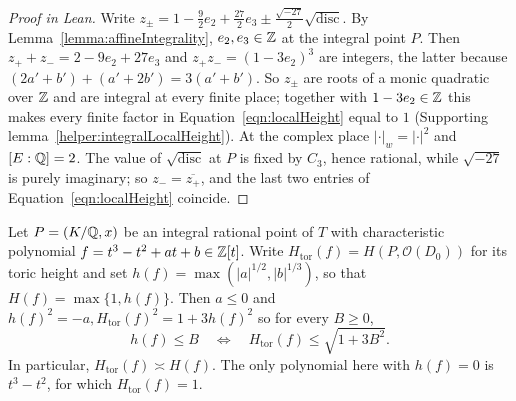 \begin{proof}[Proof in Lean]

\leanok


Write $z_\pm=1-\tfrac92e_2+\tfrac{27}2e_3\pm\tfrac{\sqrt{-27}}2\sqrt{\mathrm{disc}}$. By Lemma~\ref{lemma:affineIntegrality}, $e_2,e_3\in\mathbb{Z}$ at the integral point $P$. Then $z_++z_-=2-9e_2+27e_3$ and $z_+z_-=(1-3e_2)^3$ are integers, the latter because $(2a'+b')+(a'+2b')=3(a'+b')$. So $z_\pm$ are roots of a monic quadratic over $\mathbb{Z}$ and are integral at every finite place; together with $1-3e_2\in\mathbb{Z}$ this makes every finite factor in Equation~\ref{eqn:localHeight} equal to $1$ (Supporting lemma~\ref{helper:integralLocalHeight}). At the complex place $|\cdot|_w=|\cdot|^2$ and $[E:\mathbb{Q}]=2$. The value of $\sqrt{\mathrm{disc}}$ at $P$ is fixed by $C_3$, hence rational, while $\sqrt{-27}$ is purely imaginary; so $z_-=\overline{z_+}$, and the last two entries of Equation~\ref{eqn:localHeight} coincide.

\end{proof}

\begin{lemma}

\label{lemma:rootVsToric}


\leanok



 Let $P=(K/\mathbb{Q},x)$ be an integral rational point of $T$ with characteristic polynomial $f=t^3-t^2+at+b\in\mathbb{Z}[t]$. Write $H_{\mathrm{tor}}(f)=H(P,\mathcal O(D_0))$ for its toric height and set $h(f)=\max(|a|^{1/2},|b|^{1/3})$, so that $H(f)=\max\{1,h(f)\}$. Then $a\leq0$ and $h(f)^2=-a, H_{\mathrm{tor}}(f)^2=1+3h(f)^2$ so for every $B\geq0$, \begin{equation*} h(f)\leq B \quad\Longleftrightarrow\quad H_{\mathrm{tor}}(f)\leq\sqrt{1+3B^2}. \end{equation*} In particular, $H_{\mathrm{tor}}(f)\asymp H(f)$. The only polynomial here with $h(f)=0$ is $t^3-t^2$, for which $H_{\mathrm{tor}}(f)=1$. 

\end{lemma}

